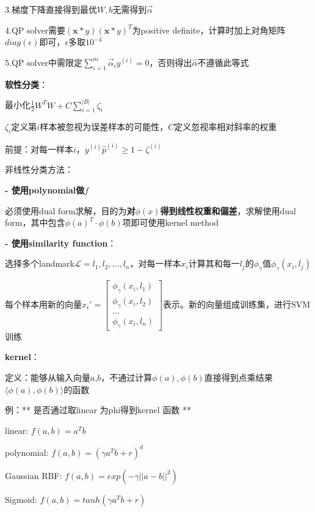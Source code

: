 \documentclass[UTF8]{ctexart}
\begin{document}
  \quad \quad \quad 3.梯度下降直接得到最优$W, b$无需得到$\vec{\alpha}$

  \quad \quad \quad 4.QP solver需要$(\textbf{x} * y)(\textbf{x} * y)^T$为positive definite，计算时加上对角矩阵$diag(\epsilon)$即可，$\epsilon$多取$10^{-4}$

  \quad \quad \quad 5.QP solver中需限定$\sum_{i=1}^{m}\vec{\alpha}_iy^{(i)}=0$，否则得出$\hat{\alpha}$不遵循此等式
  
  \quad \textbf{软性分类}：

  \quad \quad 最小化$\frac{1}{2}W^TW + C\sum_{i=1}^{|B|}\zeta_i $

  \quad \quad \quad $\zeta_i$定义第$i$样本被忽视为误差样本的可能性，$C$定义忽视率相对斜率的权重

  \quad \quad 前提：对每一样本$i$，$y^{(i)}\hat{p}^{(i)} \geq 1 - \zeta^{(i)}$

  非线性分类方法：

  \textbf{- 使用polynomial做$f$}

  \quad 必须使用dual form求解，目的为\textbf{对$\phi(x)$得到线性权重和偏差}，求解使用dual form，其中包含$\phi(a)^T \cdot \phi(b)$项即可使用kernel method

  \textbf{- 使用similarity function}：
  
  \quad 选择多个landmark$\mathcal{L} = l_1, l_2, ..., l_n$，对每一样本$x_i$计算其和每一$l_j$的$\phi_{\gamma}$值$\phi_{\gamma}(x_i, l_j)$

  \quad 每个样本用新的向量$x_i' = \begin{bmatrix}
    \phi_{\gamma}(x_i, l_1) \\
    \phi_{\gamma}(x_i, l_2) \\
    ... \\
    \phi_{\gamma}(x_i, l_n)
  \end{bmatrix}$表示。新的向量组成训练集，进行SVM训练

  \textbf{kernel}：

  \quad 定义：能够从输入向量$a$,$b$，不通过计算$\phi(a), \phi(b)$直接得到点乘结果$\langle \phi (a), \phi (b)\rangle $的函数

  \quad 例：** 是否通过取linear 为phi得到kernel 函数 **

  \quad \quad linear: $f(a, b) = a^Tb$

  \quad \quad polynomial: $f(a, b) = (\gamma a^Tb+r)^d$

  \quad \quad Gaussian RBF: $f(a, b) = exp(-\gamma ||a-b||^2)$

  \quad \quad Sigmoid: $f(a, b) = tanh(\gamma a^Tb + r)$
\end{document}
